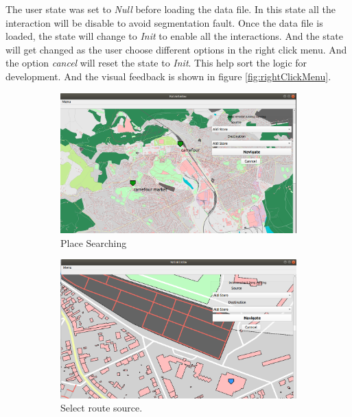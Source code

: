 \documentclass[a4paper, 12pt, english]{book}
\begin{document}
\begin{enumerate}
	The user state was set to {\textit{Null}} before loading the data file. In this state all the interaction will be disable to avoid segmentation fault. Once the data file is loaded, the state will change to {\textit{Init}} to enable all the interactions. And the state will get changed as the user choose different options in the right click menu. And the option {\textit{cancel}} will reset the state to {\textit{Init}}. This help sort the logic for development. And the visual feedback is shown in figure \ref{fig:rightClickMenu}.
	\begin{figure}[h!]
		\centering
		\begin{subfigure}[b]{0.4\linewidth}
			\includegraphics[width=\linewidth]{./img/search.png}
			\caption{Place Searching}
		\end{subfigure}
		\begin{subfigure}[b]{0.4\linewidth}
			\includegraphics[width=\linewidth]{./img/selSrc.png}
			\caption{Select route source.}
		\end{subfigure}
		\begin{subfigure}[b]{0.4\linewidth}

\end{subfigure}
\end{figure}
\end{enumerate}
\end{document}
